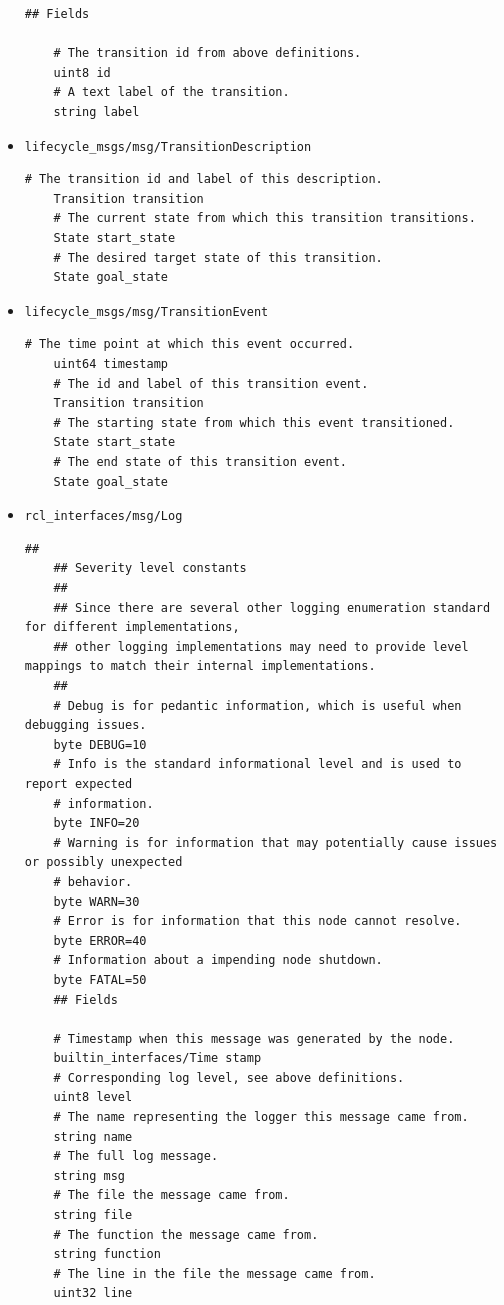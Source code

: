 \begin{itemize}
\begin{lstlisting}[language=msg,
	caption={Message definition Transition}]
	## Fields

	# The transition id from above definitions.
	uint8 id
	# A text label of the transition.
	string label
\end{lstlisting}

\item \lstinline{lifecycle_msgs/msg/TransitionDescription}
\begin{lstlisting}[language=msg,
	caption={Message definition TransitionDescription}]
	# The transition id and label of this description.
	Transition transition
	# The current state from which this transition transitions.
	State start_state
	# The desired target state of this transition.
	State goal_state
\end{lstlisting}

\item \lstinline{lifecycle_msgs/msg/TransitionEvent}
\begin{lstlisting}[language=msg,
	caption={Message definition TransitionEvent}]
	# The time point at which this event occurred.
	uint64 timestamp
	# The id and label of this transition event.
	Transition transition
	# The starting state from which this event transitioned.
	State start_state
	# The end state of this transition event.
	State goal_state
\end{lstlisting}

\item \lstinline{rcl_interfaces/msg/Log}
\begin{lstlisting}[language=msg,
	caption={Message definition TransitionEvent}]
	##
	## Severity level constants
	## 
	## Since there are several other logging enumeration standard for different implementations,
	## other logging implementations may need to provide level mappings to match their internal implementations.
	##
	# Debug is for pedantic information, which is useful when debugging issues.
	byte DEBUG=10
	# Info is the standard informational level and is used to report expected
	# information.
	byte INFO=20
	# Warning is for information that may potentially cause issues or possibly unexpected
	# behavior.
	byte WARN=30
	# Error is for information that this node cannot resolve.
	byte ERROR=40
	# Information about a impending node shutdown.
	byte FATAL=50
	## Fields

	# Timestamp when this message was generated by the node.
	builtin_interfaces/Time stamp
	# Corresponding log level, see above definitions.
	uint8 level
	# The name representing the logger this message came from.
	string name
	# The full log message.
	string msg
	# The file the message came from.
	string file
	# The function the message came from.
	string function
	# The line in the file the message came from.
	uint32 line
\end{lstlisting}

\end{itemize}

